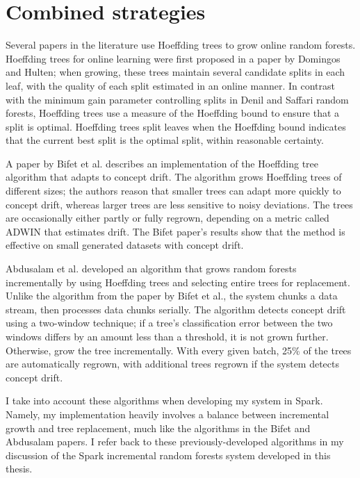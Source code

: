 \section{Combined strategies} Several papers in the literature use Hoeffding
trees to grow online random forests. Hoeffding trees for online learning were
first proposed in a paper by Domingos and Hulten; when growing, these trees
maintain several candidate splits in each leaf, with the quality of each split
estimated in an online manner. \cite{Domingos} In contrast with the minimum
gain parameter controlling splits in Denil and Saffari random forests,
Hoeffding trees use a measure of the Hoeffding bound to ensure that a split is
optimal. Hoeffding trees split leaves when the Hoeffding bound indicates that
the current best split is the optimal split, within reasonable certainty. 

A paper by Bifet et al. describes an implementation of the Hoeffding tree
algorithm that adapts to concept drift. \cite{Bifet} The algorithm grows
Hoeffding trees of different sizes; the authors reason that smaller trees can
adapt more quickly to concept drift, whereas larger trees are less sensitive to
noisy deviations. The trees are occasionally either partly or fully regrown,
depending on a metric called ADWIN that estimates drift. The Bifet paper's
results show that the method is effective on small generated datasets with
concept drift.

Abdusalam et al. developed an algorithm that grows random forests incrementally
by using Hoeffding trees and selecting entire trees for replacement. Unlike the
algorithm from the paper by Bifet et al., the system chunks a data stream, then
processes data chunks serially. The algorithm detects concept drift using a
two-window technique; if a tree's classification error between the two windows
differs by an amount less than a threshold, it is not grown further. Otherwise,
grow the tree incrementally. With every given batch, 25\% of the trees are
automatically regrown, with additional trees regrown if the system detects
concept drift.

I take into account these algorithms when developing my system in Spark.
Namely, my implementation heavily involves a balance between incremental growth
and tree replacement, much like the algorithms in the Bifet and Abdusalam
papers. I refer back to these previously-developed algorithms in my discussion
of the Spark incremental random forests system developed in this thesis.
